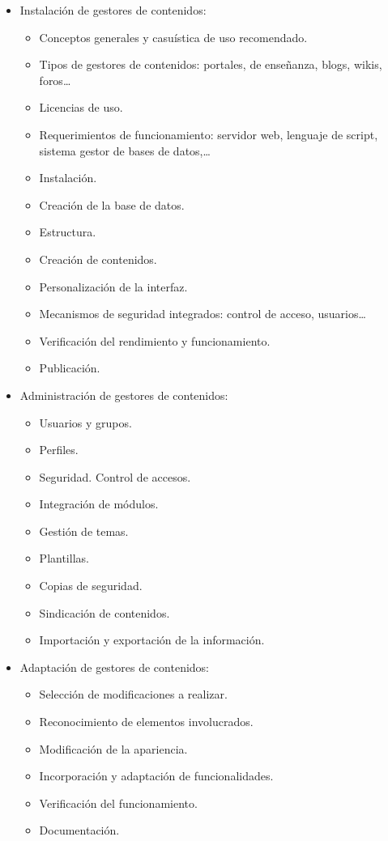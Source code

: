 \documentclass[a4paper]{article}
\begin{document}
\begin{itemize}
\item Instalación de gestores de contenidos:
\begin{itemize}
\item Conceptos generales y casuística de uso recomendado.
\item Tipos de gestores de contenidos: portales, de enseñanza, blogs, wikis, foros\ldots{}
\item Licencias de uso.
\item Requerimientos de funcionamiento: servidor web, lenguaje de script, sistema gestor de bases de datos,\ldots{}
\item Instalación.
\item Creación de la base de datos.
\item Estructura.
\item Creación de contenidos.
\item Personalización de la interfaz.
\item Mecanismos de seguridad integrados: control de acceso, usuarios\ldots{}
\item Verificación del rendimiento y funcionamiento.
\item Publicación.
\end{itemize}
\end{itemize}
\begin{itemize}
\item Administración de gestores de contenidos:
\begin{itemize}
\item Usuarios y grupos.
\item Perfiles.
\item Seguridad. Control de accesos.
\item Integración de módulos.
\item Gestión de temas.
\item Plantillas.
\item Copias de seguridad.
\item Sindicación de contenidos.
\item Importación y exportación de la información.
\end{itemize}
\end{itemize}
\begin{itemize}
\item Adaptación de gestores de contenidos:
\begin{itemize}
\item Selección de modificaciones a realizar.
\item Reconocimiento de elementos involucrados.
\item Modificación de la apariencia.
\item Incorporación y adaptación de funcionalidades.
\item Verificación del funcionamiento.
\item Documentación.
\end{itemize}
\end{itemize}
\end{document}
